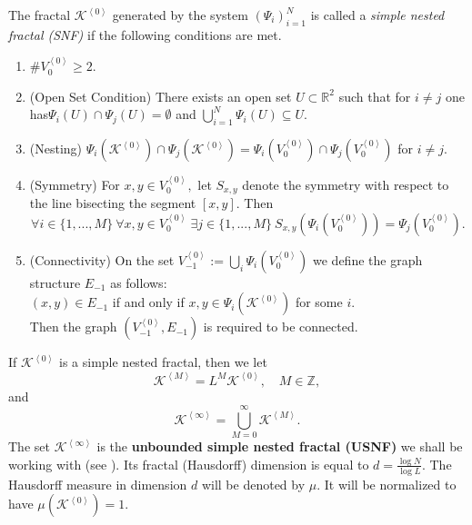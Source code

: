 \documentclass[11pt]{article}
\begin{document}
\begin{defi}
\label{def:snf}
 The fractal $\mathcal{K}^{\left\langle 0 \right\rangle}$ generated by the system $(\Psi_i)_{i=1}^N$ is called a \emph{simple nested fractal (SNF)} if the following conditions are met.
\begin{enumerate}
\item $\# V_{0}^{\left\langle 0\right\rangle} \geq 2.$
\item (Open Set Condition) There exists an open set $U \subset \mathbb{R}^2$ such that for $i\neq j$ one has\linebreak $\Psi_i (U) \cap \Psi_j (U)= \emptyset$ and $\bigcup_{i=1}^N \Psi_i (U) \subseteq U$.
\item (Nesting) $\Psi_i\left(\mathcal{K}^{\left\langle 0 \right\rangle}\right) \cap \Psi_j \left(\mathcal{K}^{\left\langle 0 \right\rangle}\right) = \Psi_i \left(V_{0}^{\left\langle 0\right\rangle}\right) \cap \Psi_j \left(V_{0}^{\left\langle 0\right\rangle}\right)$ for $i \neq j$.
\item (Symmetry) For $x,y \in V_{0}^{\left\langle 0\right\rangle},$ let $S_{x,y}$ denote the symmetry with respect to the line bisecting the segment $\left[x,y\right]$. Then
\begin{equation}
\forall i \in \{1,...,M\} \ \forall x,y \in V_{0}^{\left\langle 0\right\rangle} \ \exists j \in \{1,...,M\} \ S_{x,y} \left( \Psi_i \left(V_{0}^{\left\langle 0\right\rangle} \right) \right) = \Psi_j \left(V_{0}^{\left\langle 0\right\rangle} \right).
\end{equation}
\item (Connectivity) On the set $V_{-1}^{\left\langle 0\right\rangle}:= \bigcup_i \Psi_i \left(V_{0}^{\left\langle 0\right\rangle}\right)$ we define the graph structure $E_{-1}$ as follows:\\
$(x,y) \in E_{-1}$ if and only if $x, y \in \Psi_i\left(\mathcal{K}^{\left\langle 0 \right\rangle}\right)$ for some $i$.\\
Then the graph $(V_{-1}^{\left\langle 0\right\rangle},E_{-1} )$ is required to be connected.
\end{enumerate}
\end{defi}

If  $\mathcal{K}^{\left\langle 0 \right\rangle}$ is a simple nested fractal, then we let
\begin{equation} \label{eq:Kn}
\mathcal{K}^{\left\langle M\right\rangle} = L^M \mathcal{K}^{\left\langle 0\right\rangle}, \quad M \in \mathbb{Z},
\end{equation}
and
\begin{equation} \label{eq:Kinfty}
\mathcal{K}^{\left\langle \infty \right\rangle} = \bigcup_{M=0}^{\infty} \mathcal{K}^{\left\langle M\right\rangle}.
\end{equation}
The set $\mathcal{K}^{\left\langle \infty \right\rangle}$ is the \textbf{unbounded simple nested fractal (USNF)} we shall be working with (see \cite{bib:kpp-sausage}).  Its fractal (Hausdorff) dimension is equal to  $d=\frac{\log N}{\log L}$. The Hausdorff  measure in dimension $d$ will be denoted by $\mu$. It will be normalized to have $\mu\left(\mathcal{K}^{\left\langle 0\right\rangle}\right)=1$.
\end{document}
